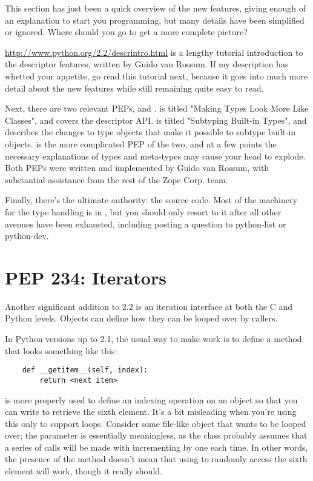 \documentclass{howto}
\begin{document}
This section has just been a quick overview of the new features,
giving enough of an explanation to start you programming, but many
details have been simplified or ignored.  Where should you go to get a
more complete picture?

\url{http://www.python.org/2.2/descrintro.html} is a lengthy tutorial
introduction to the descriptor features, written by Guido van Rossum.
If my description has whetted your appetite, go read this tutorial
next, because it goes into much more detail about the new features
while still remaining quite easy to read.

Next, there are two relevant PEPs,  and .  
is titled "Making Types Look More Like Classes", and covers the
descriptor API.   is titled "Subtyping Built-in Types", and
describes the changes to type objects that make it possible to subtype
built-in objects.   is the more complicated PEP of the two,
and at a few points the necessary explanations of types and meta-types
may cause your head to explode.  Both PEPs were written and
implemented by Guido van Rossum, with substantial assistance from the
rest of the Zope Corp. team.

Finally, there's the ultimate authority: the source code.  Most of the
machinery for the type handling is in , but
you should only resort to it after all other avenues have been
exhausted, including posting a question to python-list or python-dev. 


\section{PEP 234: Iterators}

Another significant addition to 2.2 is an iteration interface at both
the C and Python levels.  Objects can define how they can be looped
over by callers.

In Python versions up to 2.1, the usual way to make  work is to define a  method that looks
something like this:

\begin{verbatim}
    def __getitem__(self, index):
        return <next item>
\end{verbatim}

 is more properly used to define an indexing
operation on an object so that you can write  to retrieve
the sixth element.  It's a bit misleading when you're using this only
to support  loops.  Consider some file-like object that
wants to be looped over; the  parameter is essentially
meaningless, as the class probably assumes that a series of
 calls will be made with 
incrementing by one each time.  In other words, the presence of the
 method doesn't mean that using  
to randomly access the sixth element will work, though it really should.
\end{document}
